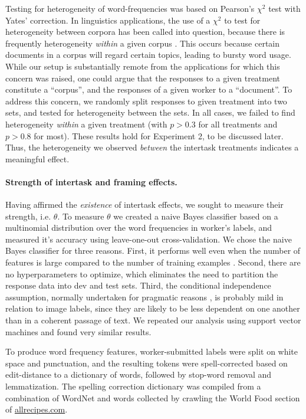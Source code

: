 \documentclass{sigchi}
\begin{document}
Testing for heterogeneity of word-frequencies was based on 
Pearson's $\chi^2$ test with Yates' correction.
In linguistics applications, the use of a $\chi^2$ to test for 
heterogeneity between corpora has been called
into question, because there is frequently heterogeneity \textit{within}
a given corpus \cite{kilgarriff1996comparing}.
This occurs because certain documents in a corpus will regard certain 
topics, leading to bursty word usage.  While our setup is substantially
remote from the applications for which this concern was raised, 
one could argue that the responses to a given treatment
constitute a ``corpus'', and the responses of a given worker to a 
``document''.
To address this concern, we randomly split responses to given treatment
into two sets, and tested for heterogeneity between the sets.
In all cases, we failed to find heterogeneity \textit{within} a given 
treatment (with $p > 0.3$ for all treatments and $p > 0.8$ for most).
These results hold for Experiment 2, to be discussed later.
Thus, the heterogeneity we observed \textit{between} the intertask 
treatments indicates a meaningful effect.

\pagebreak
\paragraph{Strength of intertask and framing effects.}
Having affirmed the \textit{existence} of intertask effects, we sought to
measure their strength, i.e. $\theta$.
To measure $\theta$ we created a naive Bayes classifier based on a 
multinomial distribution over the word frequencies in worker's labels, 
and measured it's accuracy using leave-one-out cross-validation.  
We chose the naive Bayes
classifier for three reasons.  First, it performs well even when the 
number of features is large compared to the number of training examples
\cite{bickel2004,hastie2009elements}.  
Second, there are no hyperparameters to 
optimize, which eliminates the need to partition the response data into
dev and test sets.
Third, the conditional independence assumption, normally 
undertaken for pragmatic reasons \cite{Zhang2004562}, 
is probably mild in 
relation to image labels, since they are likely to be less dependent
on one another than in a coherent passage of text.  We repeated our
analysis using support vector machines and found very similar results.

To produce word frequency features, worker-submitted labels were split on 
white
space and punctuation, and the resulting tokens were spell-corrected based
on edit-distance to a dictionary of words, followed by stop-word removal
and lemmatization.  The spelling correction
dictionary was compiled from a combination of WordNet 
\cite{felbaum1998wordnet} and words
collected by crawling the World Food section of \url{allrecipes.com}.
\end{document}

